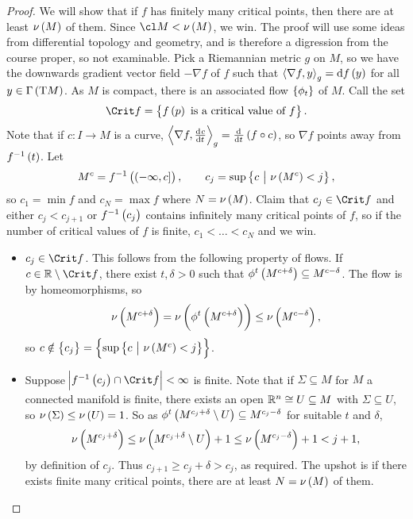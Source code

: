 \begin{proof}
We will show that if $ f $ has finitely many critical points, then there are at least $ \nu\br{M} $ of them. Since $ \cl M < \nu\br{M} $, we win. The proof will use some ideas from differential topology and geometry, and is therefore a digression from the course proper, so not examinable. Pick a Riemannian metric $ g $ on $ M $, so we have the downwards gradient vector field $ -\nabla f $ of $ f $ such that $ \abr{\nabla f, y}_g = \d f\br{y} $ for all $ y \in \Gamma\br{\T M} $. As $ M $ is compact, there is an associated flow $ \cbr{\phi_t} $ of $ M $. Call the set
$$ \Crit f = \cbr{f\br{p} \ \text{is a critical value of} \ f}. $$
Note that if $ c : I \to M $ is a curve, $ \abr{\nabla f, \tod{c}{t}}_g = \tod{}{t}\br{f \circ c} $, so $ \nabla f $ points away from $ f^{-1}\br{t} $. Let
$$ M^c = f^{-1}\br{\intoc{-\infty, c}}, \qquad c_j = \sup \cbr{c \st \nu\br{M^c} < j}, $$
so $ c_1 = \min f $ and $ c_N = \max f $ where $ N = \nu\br{M} $. Claim that $ c_j \in \Crit f $ and either $ c_j < c_{j + 1} $ or $ f^{-1}\br{c_j} $ contains infinitely many critical points of $ f $, so if the number of critical values of $ f $ is finite, $ c_1 < \dots < c_N $ and we win.

\pagebreak

\begin{itemize}
\item $ c_j \in \Crit f $. This follows from the following property of flows. If $ c \in \RR \setminus \Crit f $, there exist $ t, \delta > 0 $ such that $ \phi^t\br{M^{c + \delta}} \subseteq M^{c - \delta} $. The flow is by homeomorphisms, so
$$ \nu\br{M^{c + \delta}} = \nu\br{\phi^t\br{M^{c + \delta}}} \le \nu\br{M^{c - \delta}}, $$
so $ c \notin \cbr{c_j} = \cbr{\sup \cbr{c \st \nu\br{M^c} < j}} $.
\item Suppose $ \abs{f^{-1}\br{c_j} \cap \Crit f} < \infty $ is finite. Note that if $ \Sigma \subseteq M $ for $ M $ a connected manifold is finite, there exists an open $ \mathbb{R}^n \cong U \subseteq M $ with $ \Sigma \subseteq U $, so $ \nu\br{\Sigma} \le \nu\br{U} = 1 $. So as $ \phi^t\br{M^{c_j + \delta} \setminus U} \subseteq M^{c_j - \delta} $ for suitable $ t $ and $ \delta $,
$$ \nu\br{M^{c_j + \delta}} \le \nu\br{M^{c_j + \delta} \setminus U} + 1 \le \nu\br{M^{c_j - \delta}} + 1 < j + 1, $$
by definition of $ c_j $. Thus $ c_{j + 1} \ge c_j + \delta > c_j $, as required. The upshot is if there exists finite many critical points, there are at least $ N = \nu\br{M} $ of them.
\end{itemize}
\end{proof}

